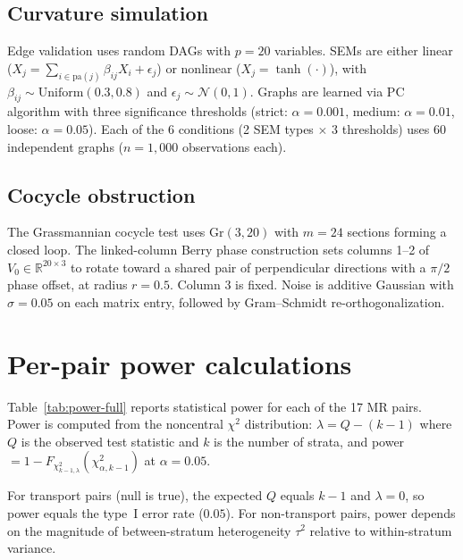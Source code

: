 \documentclass{article}
\newcommand{\Gr}{\mathrm{Gr}}
\newcommand{\R}{\mathbb{R}}
\begin{document}
\subsection{Curvature simulation}

Edge validation uses random DAGs with $p = 20$ variables. SEMs are either linear ($X_j = \sum_{i \in \mathrm{pa}(j)} \beta_{ij} X_i + \epsilon_j$) or nonlinear ($X_j = \tanh(\cdot)$), with $\beta_{ij} \sim \mathrm{Uniform}(0.3, 0.8)$ and $\epsilon_j \sim \mathcal{N}(0, 1)$. Graphs are learned via PC algorithm with three significance thresholds (strict: $\alpha = 0.001$, medium: $\alpha = 0.01$, loose: $\alpha = 0.05$). Each of the 6 conditions (2 SEM types $\times$ 3 thresholds) uses 60 independent graphs ($n = 1{,}000$ observations each).

\subsection{Cocycle obstruction}

The Grassmannian cocycle test uses $\Gr(3, 20)$ with $m = 24$ sections forming a closed loop. The linked-column Berry phase construction sets columns 1--2 of $V_0 \in \R^{20 \times 3}$ to rotate toward a shared pair of perpendicular directions with a $\pi/2$ phase offset, at radius $r = 0.5$. Column 3 is fixed. Noise is additive Gaussian with $\sigma = 0.05$ on each matrix entry, followed by Gram--Schmidt re-orthogonalization.

\section{Per-pair power calculations}
\label{app:power}

Table~\ref{tab:power-full} reports statistical power for each of the 17 MR pairs. Power is computed from the noncentral $\chi^2$ distribution: $\lambda = Q - (k-1)$ where $Q$ is the observed test statistic and $k$ is the number of strata, and power $= 1 - F_{\chi^2_{k-1,\lambda}}(\chi^2_{\alpha, k-1})$ at $\alpha = 0.05$.

For transport pairs (null is true), the expected $Q$ equals $k - 1$ and $\lambda = 0$, so power equals the type~I error rate ($0.05$). For non-transport pairs, power depends on the magnitude of between-stratum heterogeneity $\tau^2$ relative to within-stratum variance.
\end{document}
